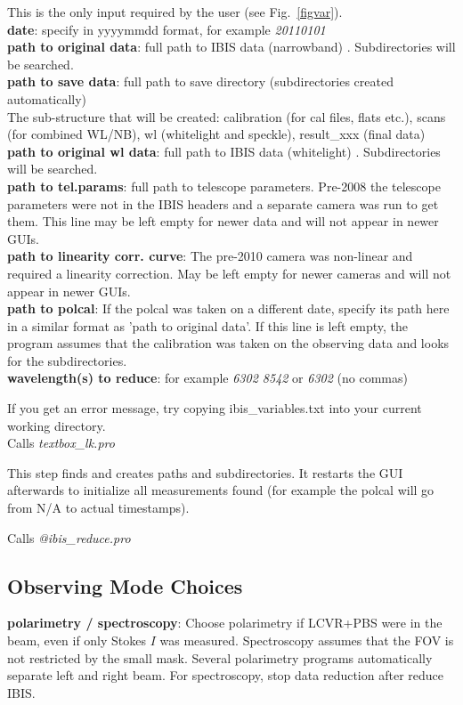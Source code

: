 \documentclass[a4paper,11pt]{article}
\begin{document}
This is the only input required by the user (see Fig.~\ref{figvar}).\\
\textbf{date}: specify in yyyymmdd format, for example \textit{20110101} \\
\textbf{path to original data}: full path to IBIS data (narrowband) . Subdirectories will be searched.\\
\textbf{path to save data}: full path to save directory (subdirectories created automatically) \\
 The sub-structure that will be created: calibration (for cal files, flats etc.), scans (for combined WL/NB), wl (whitelight and speckle), result\_xxx (final data)\\
\textbf{path to original wl data}: full path to IBIS data (whitelight) . Subdirectories will be searched.\\
\textbf{path to tel.params}: full path to telescope parameters. Pre-2008 the telescope parameters were not in the IBIS headers and a separate camera was run to get them. This line may be left empty for newer data and will not appear in newer GUIs.\\
\textbf{path to linearity corr. curve}: The pre-2010 camera was non-linear and required a linearity correction. May be left empty for newer cameras and will not appear in newer GUIs.\\
\textbf{path to polcal}: If the polcal was taken on a different date, specify its path here in a similar format as 'path to original data'. If this line is left empty, the program assumes that the calibration was taken on the observing data and looks for the subdirectories.\\
\textbf{wavelength(s) to reduce}: for example \textit{6302 8542} or \textit{6302} (no commas)

If you get an error message, try copying ibis\_variables.txt into your current working directory.\\
Calls \textit{textbox\_lk.pro}

This step finds and creates paths and subdirectories. It restarts the GUI afterwards to initialize all measurements found (for example the polcal will go from N/A to actual timestamps).

 Calls \textit{@ibis\_reduce.pro}
  
\subsection{Observing Mode Choices}
\textbf{polarimetry / spectroscopy}: Choose polarimetry if LCVR+PBS were in the beam, even if only Stokes $I$ was measured. Spectroscopy assumes that the FOV is not restricted by the small mask. Several polarimetry programs automatically separate left and right beam. For spectroscopy, stop data reduction after reduce IBIS.
\end{document}
